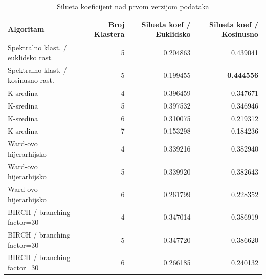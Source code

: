 \documentclass[a4paper]{article}
\begin{document}
\begin{center}
\begin{table}[H]
\caption{Silueta koeficijent nad prvom verzijom podataka}
\begin{adjustbox}{width=1\textwidth}
\begin{tabular}{lrrr}
\toprule
                           Algoritam &  Broj Klastera &  Silueta koef / Euklidsko &  Silueta koef / Kosinusno \\
\midrule
 Spektralno klast. / euklidsko rast. &              5 &                  0.204863 &                  0.439041 \\
 Spektralno klast. / kosinusno rast. &              5 &                  0.199455 &                 \textbf{0.444556}  \\
                           K-sredina &              4 &                  0.396459 &                  0.347671 \\
                           K-sredina &              5 &                  0.397532 &                  0.346946 \\
                           K-sredina &              6 &                  0.310075 &                  0.219312 \\
                           K-sredina &              7 &                  0.153298 &                  0.184236 \\
              Ward-ovo hijerarhijsko &              4 &                  0.339216 &                  0.382940 \\
              Ward-ovo hijerarhijsko &              5 &                  0.339920 &                  0.382643 \\
              Ward-ovo hijerarhijsko &              6 &                  0.261799 &                  0.228352 \\
              BIRCH / branching factor=30 &         4 &                  0.347014 &                  0.386919 \\
              BIRCH / branching factor=30 &         5 &                  0.347720 &                  0.386620  \\
              BIRCH / branching factor=30 &         6 &                  0.266185 &                     0.240132 \\
\bottomrule
\end{tabular}
\end{adjustbox}
\label{grp1_v1_sil}
\end{table}
\end{center}
\end{document}
